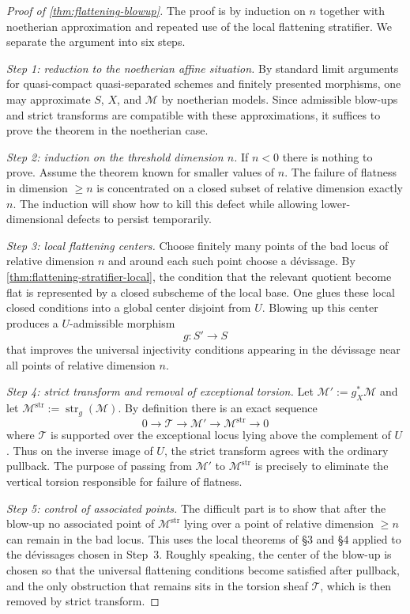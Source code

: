 \documentclass[11pt,oneside]{article}
\newcommand{\M}{\mathcal M}
\newcommand{\Tcal}{\mathcal T}
\newcommand{\st}{\operatorname{str}}
\begin{document}
\begin{proof}[Proof of \cref{thm:flattening-blowup}]
The proof is by induction on $n$ together with noetherian approximation and repeated use of the local flattening stratifier.  We separate the argument into six steps.

\smallskip
\noindent\emph{Step 1: reduction to the noetherian affine situation.}
By standard limit arguments for quasi-compact quasi-separated schemes and finitely presented morphisms, one may approximate $S$, $X$, and $\M$ by noetherian models.  Since admissible blow-ups and strict transforms are compatible with these approximations, it suffices to prove the theorem in the noetherian case.

\smallskip
\noindent\emph{Step 2: induction on the threshold dimension $n$.}
If $n<0$ there is nothing to prove.  Assume the theorem known for smaller values of $n$.  The failure of flatness in dimension $\ge n$ is concentrated on a closed subset of relative dimension exactly $n$.  The induction will show how to kill this defect while allowing lower-dimensional defects to persist temporarily.

\smallskip
\noindent\emph{Step 3: local flattening centers.}
Choose finitely many points of the bad locus of relative dimension $n$ and around each such point choose a d\'evissage.  By \cref{thm:flattening-stratifier-local}, the condition that the relevant quotient become flat is represented by a closed subscheme of the local base.  One glues these local closed conditions into a global center disjoint from $U$.  Blowing up this center produces a $U$-admissible morphism
\[
g\colon S'\to S
\]
that improves the universal injectivity conditions appearing in the d\'evissage near all points of relative dimension $n$.

\smallskip
\noindent\emph{Step 4: strict transform and removal of exceptional torsion.}
Let $\M':=g_X^*\M$ and let $\M^{\mathrm{str}}:=\st_g(\M)$.  By definition there is an exact sequence
\[
0\to \Tcal\to \M'\to \M^{\mathrm{str}}\to 0
\]
where $\Tcal$ is supported over the exceptional locus lying above the complement of $U$.  Thus on the inverse image of $U$, the strict transform agrees with the ordinary pullback.  The purpose of passing from $\M'$ to $\M^{\mathrm{str}}$ is precisely to eliminate the vertical torsion responsible for failure of flatness.

\smallskip
\noindent\emph{Step 5: control of associated points.}
The difficult part is to show that after the blow-up no associated point of $\M^{\mathrm{str}}$ lying over a point of relative dimension $\ge n$ can remain in the bad locus.  This uses the local theorems of \S3 and \S4 applied to the d\'evissages chosen in Step~3.  Roughly speaking, the center of the blow-up is chosen so that the universal flattening conditions become satisfied after pullback, and the only obstruction that remains sits in the torsion sheaf $\Tcal$, which is then removed by strict transform.


\end{proof}
\end{document}

